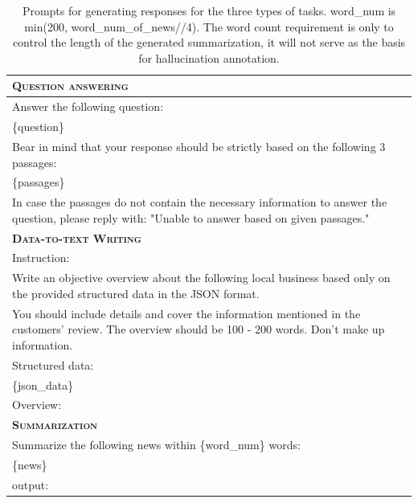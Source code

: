 \begin{table}[!ht]

\renewcommand{\arraystretch}{1.1}

\small
\centering
    \begin{tabular}{p{}}
    \toprule

    \textbf{\textsc{Question answering}}\\
    \midrule
    Answer the following question:\\
    \{question\}\\
    Bear in mind that your response should be strictly based on the following 3 passages:\\
    \{passages\}\\
    In case the passages do not contain the necessary information to answer the question, please reply with: "Unable to answer based on given passages."\\
    \midrule
    \textbf{\textsc{Data-to-text Writing}}\\
    \midrule
    Instruction:\\
    Write an objective overview about the following local business based only on the provided structured data in the JSON format.\\
    You should include details and cover the information mentioned in the customers' review. The overview should be 100 - 200 words. Don't make up information.\\
    Structured data:\\
    \{json\_data\}\\
    Overview:\\
    \midrule
    \textbf{\textsc{Summarization}}\\
    \midrule
    Summarize the following news within \{word\_num\} words:\\
    \{news\}\\
    output:\\
    \bottomrule
    \end{tabular}
    \caption{Prompts for generating responses for the three types of tasks. word\_num is min(200, word\_num\_of\_news//4). The word count requirement is only to control the length of the generated summarization, it will not serve as the basis for hallucination annotation.} 
    \label{tab:prompts}
\end{table}
